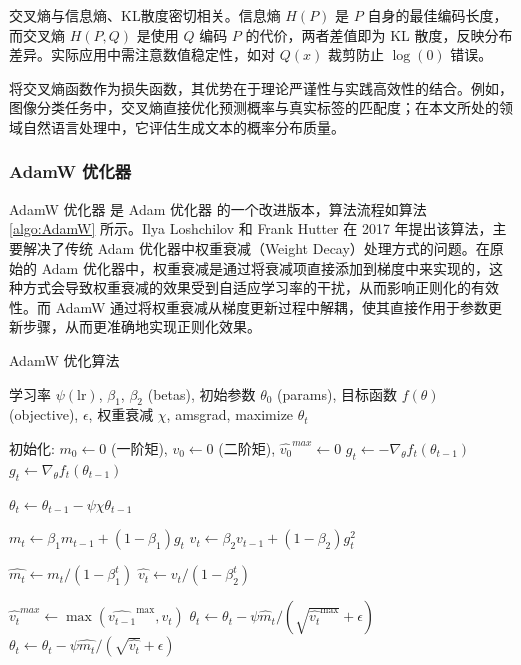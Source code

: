 交叉熵与信息熵、KL散度密切相关。信息熵 $H(P)$ 是 $P$ 自身的最佳编码长度，而交叉熵 $H(P,Q)$ 是使用 $Q$ 编码 $P$ 的代价，两者差值即为 KL 散度，反映分布差异。实际应用中需注意数值稳定性，如对 $Q(x)$ 裁剪防止 $\log(0)$ 错误。

将交叉熵函数作为损失函数，其优势在于理论严谨性与实践高效性的结合。例如，图像分类任务中，交叉熵直接优化预测概率与真实标签的匹配度；在本文所处的领域自然语言处理中，它评估生成文本的概率分布质量。

\subsubsection{AdamW 优化器}

AdamW 优化器 \cite{AdamW} 是 Adam 优化器 \cite{Adam} 的一个改进版本，算法流程如算法 \ref{algo:AdamW} 所示。Ilya Loshchilov 和 Frank Hutter 在 2017 年提出该算法，主要解决了传统 Adam 优化器中权重衰减（Weight Decay）处理方式的问题。在原始的 Adam 优化器中，权重衰减是通过将衰减项直接添加到梯度中来实现的，这种方式会导致权重衰减的效果受到自适应学习率的干扰，从而影响正则化的有效性。而 AdamW 通过将权重衰减从梯度更新过程中解耦，使其直接作用于参数更新步骤，从而更准确地实现正则化效果。

\begin{algorithm}[htb]
\caption{AdamW 优化算法} \label{algo:AdamW}
\begin{algorithmic}[1]
    \Require 学习率 $\psi(\text{lr})$, $\beta_1$, $\beta_2$ (betas), 初始参数 $\theta_0$ (params), 目标函数 $f(\theta)$ (objective), $\epsilon$, 权重衰减 $\chi$, amsgrad, maximize
    \Ensure $\theta_t$
    
    \State 初始化: $m_0 \leftarrow 0$ (一阶矩), $v_0 \leftarrow 0$ (二阶矩), $\widehat{v_0}^{max} \leftarrow 0$
            \State $g_t \leftarrow - \nabla_\theta f_t(\theta_{t-1})$
        \Else
            \State $g_t \leftarrow \nabla_\theta f_t(\theta_{t-1})$
        \EndIf
        
        \State $\theta_t \leftarrow \theta_{t-1} - \psi \chi \theta_{t-1}$ 
        
        \State $m_t \leftarrow \beta_1 m_{t-1} + (1 - \beta_1) g_t$ 
        \State $v_t \leftarrow \beta_2 v_{t-1} + (1 - \beta_2) g_t^2$ 
        
        \State $\widehat{m_t} \leftarrow m_t / (1 - \beta_1^t)$ 
        \State $\widehat{v_t} \leftarrow v_t / (1 - \beta_2^t)$
        
            \State $\widehat{v_t}^{max} \leftarrow \max(\widehat{v_{t-1}}^{\text{max}}, \widehat{v_t})$
            \State $\theta_t \leftarrow \theta_t - \psi \widehat{m}_t / (\sqrt{\widehat{v_t}^{\text{max}}} + \epsilon)$
        \Else
            \State $\theta_t \leftarrow \theta_t - \psi \widehat{m_t} / (\sqrt{\widehat{v_t}} + \epsilon)$
        \EndIf
    \EndFor
\end{algorithmic}
\end{algorithm}

